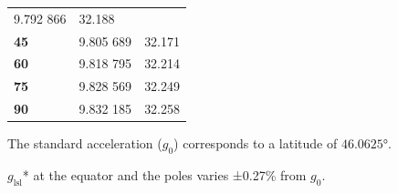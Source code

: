 \documentclass[
]{book}
\begin{document}
\begin{longtable}[]{@{}lll@{}}
\begin{minipage}[t]{0.30\columnwidth}
9.792 866\strut
\end{minipage} & \begin{minipage}[t]{0.25\columnwidth}\raggedright
32.188\strut
\end{minipage}\tabularnewline
\begin{minipage}[t]{0.18\columnwidth}\raggedright
\textbf{45}\strut
\end{minipage} & \begin{minipage}[t]{0.30\columnwidth}\raggedright
9.805 689\strut
\end{minipage} & \begin{minipage}[t]{0.25\columnwidth}\raggedright
32.171\strut
\end{minipage}\tabularnewline
\begin{minipage}[t]{0.18\columnwidth}\raggedright
\textbf{60}\strut
\end{minipage} & \begin{minipage}[t]{0.30\columnwidth}\raggedright
9.818 795\strut
\end{minipage} & \begin{minipage}[t]{0.25\columnwidth}\raggedright
32.214\strut
\end{minipage}\tabularnewline
\begin{minipage}[t]{0.18\columnwidth}\raggedright
\textbf{75}\strut
\end{minipage} & \begin{minipage}[t]{0.30\columnwidth}\raggedright
9.828 569\strut
\end{minipage} & \begin{minipage}[t]{0.25\columnwidth}\raggedright
32.249\strut
\end{minipage}\tabularnewline
\begin{minipage}[t]{0.18\columnwidth}\raggedright
\textbf{90}\strut
\end{minipage} & \begin{minipage}[t]{0.30\columnwidth}\raggedright
9.832 185\strut
\end{minipage} & \begin{minipage}[t]{0.25\columnwidth}\raggedright
32.258\strut
\end{minipage}\tabularnewline
\bottomrule
\end{longtable}

The standard acceleration (\(g_0\)) corresponds to a latitude of \(46.0625°\).

\(g_{\mathrm{lsl}}\)* at the equator and the poles varies ±0.27\% from \(g_0\).
\end{document}
